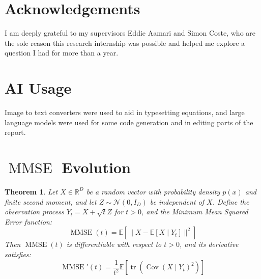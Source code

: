 \documentclass{article}
\theoremstyle{plain}
\newtheorem{theorem}{Theorem}[section]
\theoremstyle{definition}
\theoremstyle{remark}
\begin{document}
\section*{Acknowledgements}
I am deeply grateful to my supervisors Eddie Aamari and Simon Coste, who are the sole reason this research internship was possible and helped me explore a question I had for more than a year.

\section*{AI Usage}
Image to text converters were used to aid in typesetting equations, and large language models were used for some code generation and in editing parts of the report.

\newpage





\newcommand{\MMSE}{\operatorname{MMSE}}


\newpage 
\appendix
\section{\texorpdfstring{$\MMSE$}{MMSE} Evolution}

\begin{theorem}
    \label{thm:mmse}
    Let $X \in \mathbb{R}^D$ be a random vector with probability density $p(x)$ and finite second moment, and let $Z \sim \mathcal{N}(0, I_D)$ be independent of $X$. Define the observation process $Y_t = X + \sqrt{t}Z$ for $t > 0$, and the Minimum Mean Squared Error function:
    $$ \operatorname{MMSE}(t) = \mathbb{E}\left[ \|X - \mathbb{E}[X \mid Y_t]\|^2 \right] $$
    Then $\operatorname{MMSE}(t)$ is differentiable with respect to $t > 0$, and its derivative satisfies:
    $$ \operatorname{MMSE}'(t) = \frac{1}{t^2} \mathbb{E}\left[ \operatorname{tr}\left( \operatorname{Cov}(X \mid Y_t)^2 \right) \right] $$
    \end{theorem}
    
\end{document}

